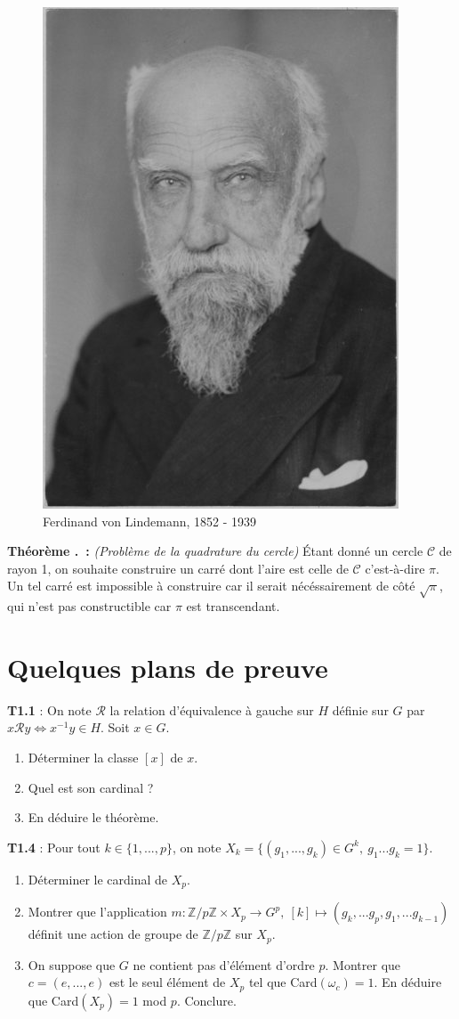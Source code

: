 \documentclass[5pt,a4paper]{article}
\newcounter{thm}[section]
\renewcommand{\thethm}{\thesection.\arabic{thm}}
\newcommand{\thm}[1]{\stepcounter{thm}\noindent\textbf{Théorème \thethm ~:} #1 \newline}
\begin{document}
\begin{onehalfspacing}
\begin{figure}[!h]
\centering
\includegraphics[width = 0.33\linewidth]{ressources/lindemann.jpg}
\caption{Ferdinand von Lindemann, 1852 - 1939}
\end{figure}

\thm{\textit{(Problème de la quadrature du cercle)} Étant donné un cercle $\mathcal{C}$ de rayon 1, on souhaite construire un carré dont l'aire est celle de $\mathcal{C}$ c'est-à-dire $\pi$. Un tel carré est impossible à construire car il serait nécéssairement de côté $\sqrt{\pi}$, qui n'est pas constructible car $\pi$ est transcendant.}

\newpage
\section{Quelques plans de preuve}

\textbf{T1.1} : On note $\mathcal{R}$ la relation d'équivalence à gauche sur $H$ définie sur $G$ par $x\mathcal{R}y \Leftrightarrow x^{-1}y \in H$. Soit $x \in G$.
\begin{enumerate}
	\item Déterminer la classe $[x]$ de $x$.
	\item Quel est son cardinal ?
	\item En déduire le théorème.
\end{enumerate}

\textbf{T1.4} : Pour tout $k \in \{1, ..., p\}$, on note $X_k = \{(g_1, ..., g_k)\in G^k,~g_1...g_k = 1\}$.
\begin{enumerate}
	\item Déterminer le cardinal de $X_p$.
	\item Montrer que l'application $m : \mathbb{Z}/p\mathbb{Z} \times X_p \rightarrow G^p,~[k] \mapsto (g_k,...g_p,g_1,...g_{k-1})$ définit une action de groupe de $\mathbb{Z}/p\mathbb{Z}$ sur $X_p$.
	\item On suppose que $G$ ne contient pas d'élément d'ordre $p$. Montrer que  $c = (e, ..., e)$ est le seul élément de $X_p$ tel que Card$(\omega_c) = 1$. En déduire que Card$(X_p) = 1$ mod $p$. Conclure.
\end{enumerate}


\end{onehalfspacing}
\end{document}
